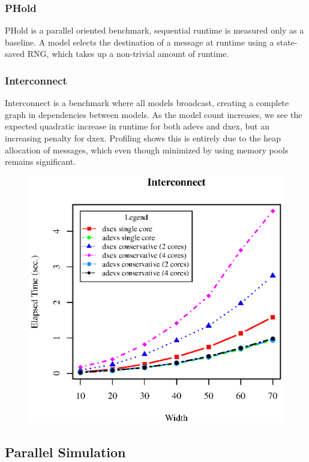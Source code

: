 \subsubsection{PHold}
PHold \cite{PHOLD} is a parallel oriented benchmark, sequential runtime is measured only as a baseline. A model selects the destination of a message at runtime using a state-saved RNG, which takes up a non-trivial amount of runtime.

\subsubsection{Interconnect}
Interconnect \cite{van2013research} is a benchmark where all models broadcast, creating a complete graph in dependencies between models. As the model count increases, we see the expected quadratic increase in runtime for both adevs and dxex, but an increasing penalty for dxex. Profiling shows this is entirely due to the heap allocation of messages, which even though minimized by using memory pools remains significant.\\
\begin{figure}[h]
	\includegraphics[width=.5\textwidth]{fig/fig3.eps}
	\label{fig3.eps}
\end{figure}

\subsection{Parallel Simulation}
